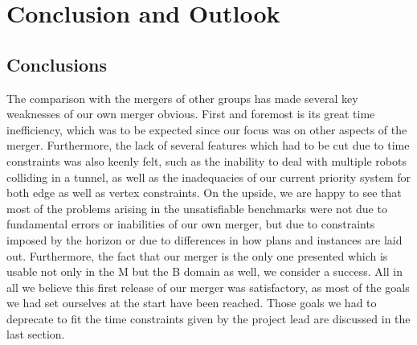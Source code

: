 \documentclass{llncs}
\begin{document}
\section{Conclusion and Outlook}
\subsection{Conclusions}
The comparison with the mergers of other groups has made several key weaknesses of our own merger obvious. First and foremost is its great time inefficiency, which was to be expected since our focus was on other aspects of the merger. Furthermore, the lack of several features which had to be cut due to time constraints was also keenly felt, such as the inability to deal with multiple robots colliding in a tunnel, as well as the inadequacies of our current priority system for both edge as well as vertex constraints.\newline\newline
On the upside, we are happy to see that most of the problems arising in the unsatisfiable benchmarks were not due to fundamental errors or inabilities of our own merger, but due to constraints imposed by the horizon or due to differences in how plans and instances are laid out. Furthermore, the fact that our merger is the only one presented which is usable not only in the M but the B domain as well, we consider a success.\newline\newline
All in all we believe this first release of our merger was satisfactory, as most of the goals we had set ourselves at the start have been reached. Those goals we had to deprecate to fit the time constraints given by the project lead are discussed in the last section.
\end{document}
